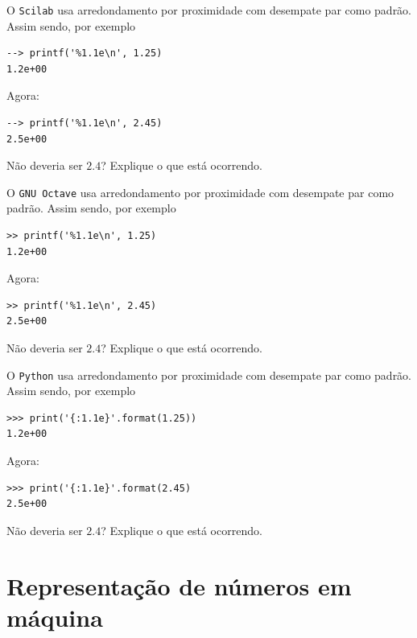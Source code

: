 \ifisscilab
\begin{exer}
  O \verb+Scilab+ usa arredondamento por proximidade com desempate par
  como padrão. Assim sendo, por exemplo
\begin{verbatim}
--> printf('%1.1e\n', 1.25)
1.2e+00
\end{verbatim}
  Agora:
\begin{verbatim}
--> printf('%1.1e\n', 2.45)
2.5e+00
\end{verbatim}
  Não deveria ser $2.4$? Explique o que está ocorrendo.
\end{exer}
\begin{resp}
  \construirResp
\end{resp}
\fi
\ifisoctave
\begin{exer}
  O \verb+GNU Octave+ usa arredondamento por proximidade com desempate
  par como padrão. Assim sendo, por exemplo
\begin{verbatim}
>> printf('%1.1e\n', 1.25)
1.2e+00
\end{verbatim}
  Agora:
\begin{verbatim}
>> printf('%1.1e\n', 2.45)
2.5e+00
\end{verbatim}
  Não deveria ser $2.4$? Explique o que está ocorrendo.
\end{exer}
\begin{resp}
  \construirResp
\end{resp}
\fi
\ifispython
\begin{exer}
  O \verb+Python+ usa arredondamento por proximidade com desempate par
  como padrão. Assim sendo, por exemplo
\begin{verbatim}
>>> print('{:1.1e}'.format(1.25))
1.2e+00
\end{verbatim}
  Agora:
\begin{verbatim}
>>> print('{:1.1e}'.format(2.45)
2.5e+00
\end{verbatim}
  Não deveria ser $2.4$? Explique o que está ocorrendo.
\end{exer}
\begin{resp}
  \construirResp
\end{resp}
\fi


\section{Representação de números em máquina}

